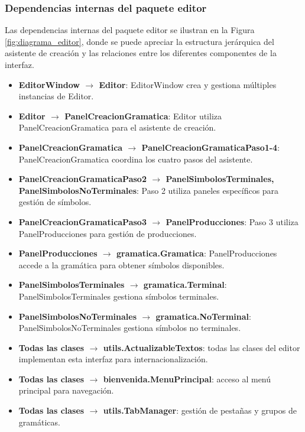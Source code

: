 \subsubsection{Dependencias internas del paquete editor}

Las dependencias internas del paquete editor se ilustran en la Figura \ref{fig:diagrama_editor}, donde se puede apreciar la estructura jerárquica del asistente de creación y las relaciones entre los diferentes componentes de la interfaz.

\begin{itemize}
    \item \textbf{EditorWindow $\rightarrow$ Editor}: EditorWindow crea y gestiona múltiples instancias de Editor.
    \item \textbf{Editor $\rightarrow$ PanelCreacionGramatica}: Editor utiliza PanelCreacionGramatica para el asistente de creación.
    \item \textbf{PanelCreacionGramatica $\rightarrow$ PanelCreacionGramaticaPaso1-4}: PanelCreacionGramatica coordina los cuatro pasos del asistente.
    \item \textbf{PanelCreacionGramaticaPaso2 $\rightarrow$ PanelSimbolosTerminales, PanelSimbolosNoTerminales}: Paso 2 utiliza paneles específicos para gestión de símbolos.
    \item \textbf{PanelCreacionGramaticaPaso3 $\rightarrow$ PanelProducciones}: Paso 3 utiliza PanelProducciones para gestión de producciones.
    \item \textbf{PanelProducciones $\rightarrow$ gramatica.Gramatica}: PanelProducciones accede a la gramática para obtener símbolos disponibles.
    \item \textbf{PanelSimbolosTerminales $\rightarrow$ gramatica.Terminal}: PanelSimbolosTerminales gestiona símbolos terminales.
    \item \textbf{PanelSimbolosNoTerminales $\rightarrow$ gramatica.NoTerminal}: PanelSimbolosNoTerminales gestiona símbolos no terminales.
    \item \textbf{Todas las clases $\rightarrow$ utils.ActualizableTextos}: todas las clases del editor implementan esta interfaz para internacionalización.
    \item \textbf{Todas las clases $\rightarrow$ bienvenida.MenuPrincipal}: acceso al menú principal para navegación.
    \item \textbf{Todas las clases $\rightarrow$ utils.TabManager}: gestión de pestañas y grupos de gramáticas.
\end{itemize}


